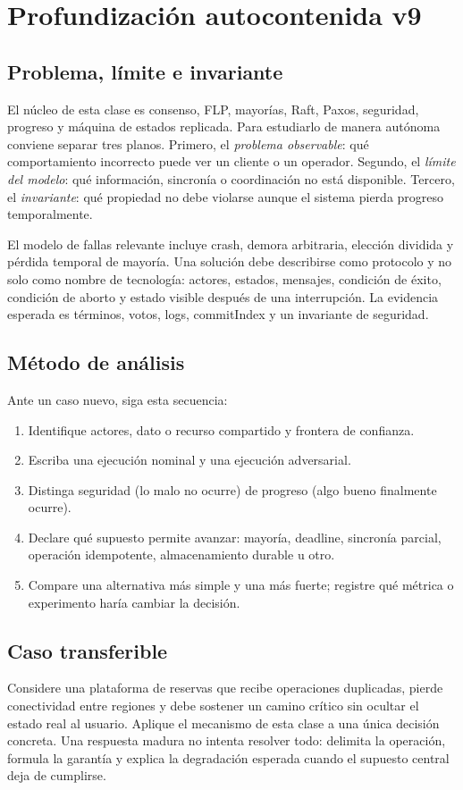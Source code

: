 \documentclass[variant=apuntes,cover=institutional,mode=screen]{ua-engineering-v6-article}
\begin{document}
\section{Profundización autocontenida v9}
\subsection{Problema, límite e invariante}
El núcleo de esta clase es consenso, FLP, mayorías, Raft, Paxos, seguridad, progreso y máquina de estados replicada. Para estudiarlo de manera autónoma conviene separar tres planos. Primero, el \emph{problema observable}: qué comportamiento incorrecto puede ver un cliente o un operador. Segundo, el \emph{límite del modelo}: qué información, sincronía o coordinación no está disponible. Tercero, el \emph{invariante}: qué propiedad no debe violarse aunque el sistema pierda progreso temporalmente.

El modelo de fallas relevante incluye crash, demora arbitraria, elección dividida y pérdida temporal de mayoría. Una solución debe describirse como protocolo y no solo como nombre de tecnología: actores, estados, mensajes, condición de éxito, condición de aborto y estado visible después de una interrupción. La evidencia esperada es términos, votos, logs, commitIndex y un invariante de seguridad.

\subsection{Método de análisis}
Ante un caso nuevo, siga esta secuencia:
\begin{enumerate}
\item Identifique actores, dato o recurso compartido y frontera de confianza.
\item Escriba una ejecución nominal y una ejecución adversarial.
\item Distinga seguridad (lo malo no ocurre) de progreso (algo bueno finalmente ocurre).
\item Declare qué supuesto permite avanzar: mayoría, deadline, sincronía parcial, operación idempotente, almacenamiento durable u otro.
\item Compare una alternativa más simple y una más fuerte; registre qué métrica o experimento haría cambiar la decisión.
\end{enumerate}

\subsection{Caso transferible}
Considere una plataforma de reservas que recibe operaciones duplicadas, pierde conectividad entre regiones y debe sostener un camino crítico sin ocultar el estado real al usuario. Aplique el mecanismo de esta clase a una única decisión concreta. Una respuesta madura no intenta resolver todo: delimita la operación, formula la garantía y explica la degradación esperada cuando el supuesto central deja de cumplirse.
\end{document}
